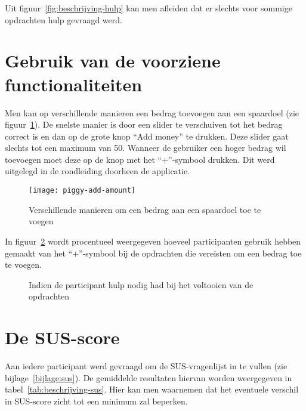 Uit figuur~\ref{fig:beschrijving-hulp} kan men afleiden dat er slechts voor sommige opdrachten hulp gevraagd werd.

\section{Gebruik van de voorziene functionaliteiten}
\label{sec:gebruik-functionaliteiten}

Men kan op verschillende manieren een bedrag toevoegen aan een spaardoel (zie figuur~\ref{fig:piggy:add-amount}). De snelste manier is door een slider te verschuiven tot het bedrag correct is en dan op de grote knop ``Add money'' te drukken. Deze slider gaat slechts tot een maximum van 50. Wanneer de gebruiker een hoger bedrag wil toevoegen moet deze op de knop met het ``+''-symbool drukken. Dit werd uitgelegd in de rondleiding doorheen de applicatie.

\begin{figure}[h!]
    \centering
    \texttt{[image: piggy-add-amount]}
    \caption{Verschillende manieren om een bedrag aan een spaardoel toe te voegen}
    \label{fig:piggy:add-amount}
\end{figure}

In figuur~\ref{fig:beschrijving-plus} wordt procentueel weergegeven hoeveel participanten gebruik hebben gemaakt van het ``+''-symbool bij de opdrachten die vereisten om een bedrag toe te voegen.

\begin{figure}[h]
    \centering
    \qquad
    \caption{Indien de participant hulp nodig had bij het voltooien van de opdrachten}
    \label{fig:beschrijving-plus}
\end{figure}

\section{De SUS-score}
\label{sec:sus}

Aan iedere participant werd gevraagd om de SUS-vragenlijst in te vullen (zie bijlage~\ref{bijlage:sus}). De gemiddelde resultaten hiervan worden weergegeven in tabel~\ref{tab:beschrijving-sus}. Hier kan men waarnemen dat het eventuele verschil in SUS-score zicht tot een minimum zal beperken.

